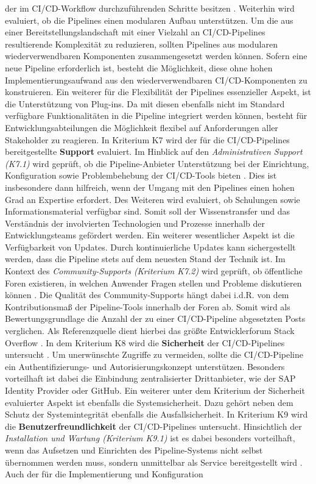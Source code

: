 der im CI/CD-Workflow durchzuführenden Schritte besitzen \cite[Z. 70 ff.]{ProductOwnerSAPBTPProd&Infra.}. Weiterhin wird evaluiert, ob die Pipelines einen modularen Aufbau unterstützen. Um die aus einer Bereitstellungslandschaft mit einer Vielzahl an CI/CD-Pipelines resultierende Komplexität zu reduzieren, sollten Pipelines aus modularen wiederverwendbaren Komponenten zusammengesetzt werden können. Sofern eine neue Pipeline erforderlich ist, besteht die Möglichkeit, diese ohne hohen Implementierungsaufwand aus den wiederverwendbaren CI/CD-Komponenten zu konstruieren. Ein weiterer für die Flexibilität der Pipelines essenzieller Aspekt, ist die Unterstützung von Plug-ins. Da mit diesen ebenfalls nicht im Standard verfügbare Funktionalitäten in die Pipeline integriert werden können, besteht für Entwicklungsabteilungen die Möglichkeit flexibel auf Anforderungen aller Stakeholder zu reagieren. In Kriterium K7 wird der für die CI/CD-Pipelines bereitgestellte \textbf{Support} evaluiert. Im Hinblick auf den \textit{Administrativen Support (K7.1)} wird geprüft, ob die Pipeline-Anbieter Unterstützung bei der Einrichtung, Konfiguration sowie Problembehebung der CI/CD-Tools bieten \cite[Z. 44 ff.]{ProductManagerSAPHyperspaceCICD.}. Dies ist insbesondere dann hilfreich, wenn der Umgang mit den Pipelines einen hohen Grad an Expertise erfordert. Des Weiteren wird evaluiert, ob Schulungen sowie Informationsmaterial verfügbar sind. Somit soll der Wissenstransfer und das Verständnis der involvierten Technologien und Prozesse innerhalb der Entwicklungsteams gefördert werden. Ein weiterer wesentlicher Aspekt ist die Verfügbarkeit von Updates. Durch kontinuierliche Updates kann sichergestellt werden, dass die Pipeline stets auf dem neuesten Stand der Technik ist. Im Kontext des \textit{Community-Supports (Kriterium K7.2)} wird geprüft, ob öffentliche Foren existieren, in welchen Anwender Fragen stellen und Probleme diskutieren können \cite[Z. 46 ff.]{ProductManagerSAPHyperspaceCICD.}. Die Qualität des Community-Supports hängt dabei i.d.R. von dem Kontributionsmaß der Pipeline-Tools innerhalb der Foren ab. Somit wird als Bewertungsgrundlage die Anzahl der zu einer CI/CD-Pipeline abgesetzten Posts verglichen. Als Referenzquelle dient hierbei das größte Entwicklerforum Stack Overflow \cite{StackOverflow.20230403}. In dem Kriterium K8 wird die \textbf{Sicherheit} der CI/CD-Pipelines untersucht \cite[Z. 79 ff.]{ProductOwnerSAPBTPProd&Infra.}. Um unerwünschte Zugriffe zu vermeiden, sollte die CI/CD-Pipeline ein Authentifizierungs- und Autorisierungskonzept unterstützen. Besonders vorteilhaft ist dabei die Einbindung zentralisierter Drittanbieter, wie der SAP Identity Provider oder GitHub. Ein weiterer unter dem Kriterium der Sicherheit evaluierter Aspekt ist ebenfalls die Systemsicherheit. Dazu gehört neben dem Schutz der Systemintegrität ebenfalls die Ausfallsicherheit. In Kriterium K9 wird die \textbf{Benutzerfreundlichkeit} der CI/CD-Pipelines untersucht. Hinsichtlich der \textit{Installation und Wartung (Kriterium K9.1)} ist es dabei besonders vorteilhaft, wenn das Aufsetzen und Einrichten des Pipeline-Systems nicht selbst übernommen werden muss, sondern unmittelbar als Service bereitgestellt wird \cite[Z. 67 ff.]{ProductOwnerSAPBTPProd&Infra.}. Auch der für die Implementierung und Konfiguration 